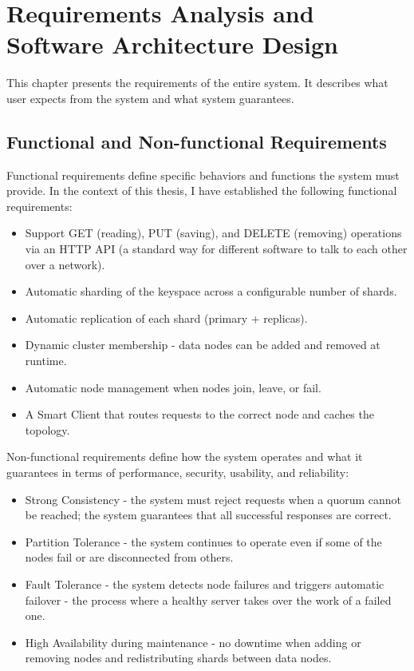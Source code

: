 \documentclass[shortabstract]{iithesis}
\begin{document}
\chapter{Requirements Analysis and Software Architecture Design} \label{chap:requirements}

This chapter presents the requirements of the entire system. It describes what user expects from the system and what system guarantees. 

\section{Functional and Non-functional Requirements}
Functional requirements define specific behaviors and functions the system must provide. In the context of this thesis, I have established the following functional requirements:
\begin{itemize}
    \item Support GET (reading), PUT (saving), and DELETE (removing) operations via an HTTP API (a standard way for different software to talk to each other over a network).
    \item Automatic sharding of the keyspace across a configurable number of shards.
    \item Automatic replication of each shard (primary + replicas).
    \item Dynamic cluster membership - data nodes can be added and removed at runtime.
    \item Automatic node management when nodes join, leave, or fail.
    \item A Smart Client that routes requests to the correct node and caches the topology.
\end{itemize}

\noindent Non-functional requirements define how the system operates and what it guarantees in terms of performance, security, usability, and reliability:
\begin{itemize}
    \item Strong Consistency - the system must reject requests when a quorum cannot be reached; the system guarantees that all successful responses are correct.
    \item Partition Tolerance - the system continues to operate even if some of the nodes fail or are disconnected from others.
    \item Fault Tolerance - the system detects node failures and triggers automatic failover - the process where a healthy server takes over the work of a failed one.
    \item High Availability during maintenance - no downtime when adding or removing nodes and redistributing shards between data nodes.
\end{itemize}
\end{document}

